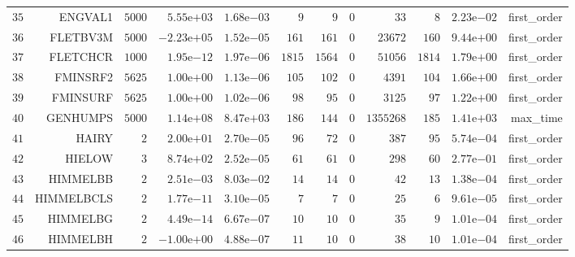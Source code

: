 \begin{longtable}{rrrrrrrrrrrr}
  \(    35\) & ENGVAL1 & \(  5000\) & \( 5.55\)e\(+03\) & \( 1.68\)e\(-03\) & \(     9\) & \(     9\) & \(     0\) & \(    33\) & \(     8\) & \( 2.23\)e\(-02\) & first\_order \\
  \(    36\) & FLETBV3M & \(  5000\) & \(-2.23\)e\(+05\) & \( 1.52\)e\(-05\) & \(   161\) & \(   161\) & \(     0\) & \( 23672\) & \(   160\) & \( 9.44\)e\(+00\) & first\_order \\
  \(    37\) & FLETCHCR & \(  1000\) & \( 1.95\)e\(-12\) & \( 1.97\)e\(-06\) & \(  1815\) & \(  1564\) & \(     0\) & \( 51056\) & \(  1814\) & \( 1.79\)e\(+00\) & first\_order \\
  \(    38\) & FMINSRF2 & \(  5625\) & \( 1.00\)e\(+00\) & \( 1.13\)e\(-06\) & \(   105\) & \(   102\) & \(     0\) & \(  4391\) & \(   104\) & \( 1.66\)e\(+00\) & first\_order \\
  \(    39\) & FMINSURF & \(  5625\) & \( 1.00\)e\(+00\) & \( 1.02\)e\(-06\) & \(    98\) & \(    95\) & \(     0\) & \(  3125\) & \(    97\) & \( 1.22\)e\(+00\) & first\_order \\
  \(    40\) & GENHUMPS & \(  5000\) & \( 1.14\)e\(+08\) & \( 8.47\)e\(+03\) & \(   186\) & \(   144\) & \(     0\) & \(1355268\) & \(   185\) & \( 1.41\)e\(+03\) & max\_time \\
  \(    41\) & HAIRY & \(     2\) & \( 2.00\)e\(+01\) & \( 2.70\)e\(-05\) & \(    96\) & \(    72\) & \(     0\) & \(   387\) & \(    95\) & \( 5.74\)e\(-04\) & first\_order \\
  \(    42\) & HIELOW & \(     3\) & \( 8.74\)e\(+02\) & \( 2.52\)e\(-05\) & \(    61\) & \(    61\) & \(     0\) & \(   298\) & \(    60\) & \( 2.77\)e\(-01\) & first\_order \\
  \(    43\) & HIMMELBB & \(     2\) & \( 2.51\)e\(-03\) & \( 8.03\)e\(-02\) & \(    14\) & \(    14\) & \(     0\) & \(    42\) & \(    13\) & \( 1.38\)e\(-04\) & first\_order \\
  \(    44\) & HIMMELBCLS & \(     2\) & \( 1.77\)e\(-11\) & \( 3.10\)e\(-05\) & \(     7\) & \(     7\) & \(     0\) & \(    25\) & \(     6\) & \( 9.61\)e\(-05\) & first\_order \\
  \(    45\) & HIMMELBG & \(     2\) & \( 4.49\)e\(-14\) & \( 6.67\)e\(-07\) & \(    10\) & \(    10\) & \(     0\) & \(    35\) & \(     9\) & \( 1.01\)e\(-04\) & first\_order \\
  \(    46\) & HIMMELBH & \(     2\) & \(-1.00\)e\(+00\) & \( 4.88\)e\(-07\) & \(    11\) & \(    10\) & \(     0\) & \(    38\) & \(    10\) & \( 1.01\)e\(-04\) & first\_order \\

\end{longtable}
